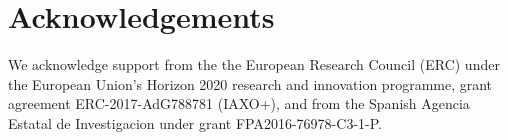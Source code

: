 \documentclass[article]{elsarticle}
\begin{document}
\linenumbers






\section*{Acknowledgements}
We acknowledge support from the the European Research Council (ERC) under the European Union’s Horizon 2020 research and innovation programme, grant agreement ERC-2017-AdG788781 (IAXO+), and from the Spanish Agencia Estatal de Investigacion under grant FPA2016-76978-C3-1-P.

  \centering


\end{document}
